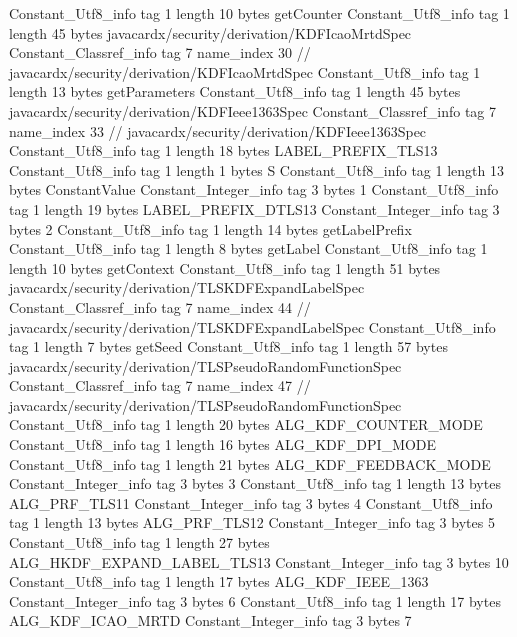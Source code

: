 {{{		}
		Constant_Utf8_info {
			tag	1
			length	10
			bytes	getCounter
		}
		Constant_Utf8_info {
			tag	1
			length	45
			bytes	javacardx/security/derivation/KDFIcaoMrtdSpec
		}
		Constant_Classref_info {
			tag	7
			name_index	30		// javacardx/security/derivation/KDFIcaoMrtdSpec
		}
		Constant_Utf8_info {
			tag	1
			length	13
			bytes	getParameters
		}
		Constant_Utf8_info {
			tag	1
			length	45
			bytes	javacardx/security/derivation/KDFIeee1363Spec
		}
		Constant_Classref_info {
			tag	7
			name_index	33		// javacardx/security/derivation/KDFIeee1363Spec
		}
		Constant_Utf8_info {
			tag	1
			length	18
			bytes	LABEL_PREFIX_TLS13
		}
		Constant_Utf8_info {
			tag	1
			length	1
			bytes	S
		}
		Constant_Utf8_info {
			tag	1
			length	13
			bytes	ConstantValue
		}
		Constant_Integer_info {
			tag	3
			bytes	1
		}
		Constant_Utf8_info {
			tag	1
			length	19
			bytes	LABEL_PREFIX_DTLS13
		}
		Constant_Integer_info {
			tag	3
			bytes	2
		}
		Constant_Utf8_info {
			tag	1
			length	14
			bytes	getLabelPrefix
		}
		Constant_Utf8_info {
			tag	1
			length	8
			bytes	getLabel
		}
		Constant_Utf8_info {
			tag	1
			length	10
			bytes	getContext
		}
		Constant_Utf8_info {
			tag	1
			length	51
			bytes	javacardx/security/derivation/TLSKDFExpandLabelSpec
		}
		Constant_Classref_info {
			tag	7
			name_index	44		// javacardx/security/derivation/TLSKDFExpandLabelSpec
		}
		Constant_Utf8_info {
			tag	1
			length	7
			bytes	getSeed
		}
		Constant_Utf8_info {
			tag	1
			length	57
			bytes	javacardx/security/derivation/TLSPseudoRandomFunctionSpec
		}
		Constant_Classref_info {
			tag	7
			name_index	47		// javacardx/security/derivation/TLSPseudoRandomFunctionSpec
		}
		Constant_Utf8_info {
			tag	1
			length	20
			bytes	ALG_KDF_COUNTER_MODE
		}
		Constant_Utf8_info {
			tag	1
			length	16
			bytes	ALG_KDF_DPI_MODE
		}
		Constant_Utf8_info {
			tag	1
			length	21
			bytes	ALG_KDF_FEEDBACK_MODE
		}
		Constant_Integer_info {
			tag	3
			bytes	3
		}
		Constant_Utf8_info {
			tag	1
			length	13
			bytes	ALG_PRF_TLS11
		}
		Constant_Integer_info {
			tag	3
			bytes	4
		}
		Constant_Utf8_info {
			tag	1
			length	13
			bytes	ALG_PRF_TLS12
		}
		Constant_Integer_info {
			tag	3
			bytes	5
		}
		Constant_Utf8_info {
			tag	1
			length	27
			bytes	ALG_HKDF_EXPAND_LABEL_TLS13
		}
		Constant_Integer_info {
			tag	3
			bytes	10
		}
		Constant_Utf8_info {
			tag	1
			length	17
			bytes	ALG_KDF_IEEE_1363
		}
		Constant_Integer_info {
			tag	3
			bytes	6
		}
		Constant_Utf8_info {
			tag	1
			length	17
			bytes	ALG_KDF_ICAO_MRTD
		}
		Constant_Integer_info {
			tag	3
			bytes	7
		}
}}
